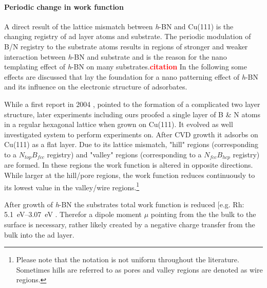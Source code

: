 \paragraph{Periodic change in work function}
A direct result of the lattice mismatch between \textit{h}-BN and Cu(111) is the changing registry of ad layer atoms and substrate. The periodic modulation of B/N registry to the substrate atoms results in regions of stronger and weaker interaction between \textit{h}-BN and substrate and is the reason for the nano templating effect of \textit{h}-BN on many substrates.\textcolor{red}{\textbf{citation}} In the following some effects are discussed that lay the foundation for a nano patterning effect of \textit{h}-BN and its influence on the electronic structure of adsorbates.

While a first report in 2004 \cite{corso_boron_2004}, pointed to the formation of a complicated two layer structure, later experiments \cite{roth_chemical_2013, li_grain_2015} including ours \cite{joshi_boron_2012, schwarz_corrugation_2017} proofed a single layer of B \& N atoms in a regular hexagonal lattice when grown on Cu(111). It evolved as well investigated system to perform experiments on. After CVD growth it adsorbs on Cu(111) as a flat layer. Due to its  lattice mismatch, "hill" regions  (corresponding to a $N_{top}B_{fcc}$ registry) and "valley" regions (corresponding to a $N_{fcc}B_{hcp}$ registry) are formed. In these regions the work function is altered in opposite directions. While larger at the hill/pore regions, the work function reduces continuously to its lowest value in the valley/wire regions.\footnote{Please note that the notation is not uniform throughout the literature. Sometimes hills are referred to as pores and valley regions are denoted as wire regions.} 

After growth of \textit{h}-BN the substrates total work function is reduced [e.g. Rh: \SIrange{5.1}{3.07}{\eV} \cite{gomez_diaz_hexagonal_2013}. Therefor a dipole moment $\mu$ pointing from the the bulk to the surface is necessary, rather likely created by a negative charge transfer from the bulk into the ad layer.\cite{roman_periodic_2013}

